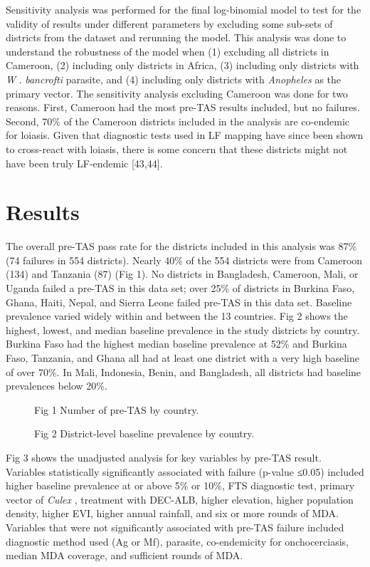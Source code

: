 \documentclass[11pt,a4paper]{article}
\begin{document}
Sensitivity analysis was performed for the final log-binomial model to test for the validity of results under different parameters by excluding some sub-sets of districts from the dataset and rerunning the model. This analysis was done to understand the robustness of the model when (1) excluding all districts in Cameroon, (2) including only districts in Africa, (3) including only districts with \textit{W} . \textit{bancrofti} parasite, and (4) including only districts with \textit{Anopheles} as the primary vector. The sensitivity analysis excluding Cameroon was done for two reasons. First, Cameroon had the most pre-TAS results included, but no failures. Second, 70\% of the Cameroon districts included in the analysis are co-endemic for loiasis. Given that diagnostic tests used in LF mapping have since been shown to cross-react with loiasis, there is some concern that these districts might not have been truly LF-endemic [43,44].

\section{Results}

The overall pre-TAS pass rate for the districts included in this analysis was 87\% (74 failures in 554 districts). Nearly 40\% of the 554 districts were from Cameroon (134) and Tanzania (87) (Fig 1). No districts in Bangladesh, Cameroon, Mali, or Uganda failed a pre-TAS in this data set; over 25\% of districts in Burkina Faso, Ghana, Haiti, Nepal, and Sierra Leone failed pre-TAS in this data set. Baseline prevalence varied widely within and between the 13 countries. Fig 2 shows the highest, lowest, and median baseline prevalence in the study districts by country. Burkina Faso had the highest median baseline prevalence at 52\% and Burkina Faso, Tanzania, and Ghana all had at least one district with a very high baseline of over 70\%. In Mali, Indonesia, Benin, and Bangladesh, all districts had baseline prevalences below 20\%.

\begin{figure}[h]
\caption{Fig 1 Number of pre-TAS by country.}
\end{figure}

\begin{figure}[h]
\caption{Fig 2 District-level baseline prevalence by country.}
\end{figure}

Fig 3 shows the unadjusted analysis for key variables by pre-TAS result. Variables statistically significantly associated with failure (p-value ≤0.05) included higher baseline prevalence at or above 5\% or 10\%, FTS diagnostic test, primary vector of \textit{Culex} , treatment with DEC-ALB, higher elevation, higher population density, higher EVI, higher annual rainfall, and six or more rounds of MDA. Variables that were not significantly associated with pre-TAS failure included diagnostic method used (Ag or Mf), parasite, co-endemicity for onchocerciasis, median MDA coverage, and sufficient rounds of MDA.
\end{document}
